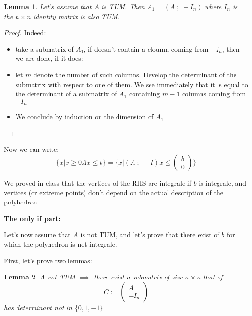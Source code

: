 \documentclass[11pt]{article}
\newtheorem{thm}{Lemma}
\begin{document}
\begin{thm}
Let's assume that \(A\) is TUM. Then  \(A_1 = (A \; ; \; -I_n )\) where \(I_n\) is the \(n \times n\) identity matrix is also TUM.
\end{thm}
\begin{proof}
Indeed:
\begin{itemize}
\item take a submatrix of \(A_1\), if doesn't contain a cloumn coming from \(-I_n\), then we are done, if it does:
\item let \(m\) denote the number of such columns. Develop the determinant of the submatrix with respect to one of them. We see immediately that it is equal to the determinant of a submatrix of \(A_1\) containing \(m-1\) columns coming from \(-I_n\)
\item We conclude by induction on the dimension of \(A_1\)
\end{itemize}
\end{proof}

Now we can write:
\[\{ x | x \ge 0 Ax \le b\} = \{ x |  (A \; ; \; -I ) x \le \begin{pmatrix}b \\ 0\end{pmatrix}  \}\]

We proved in class that the vertices of the RHS are integrale if \(b\) is integrale, and vertices (or extreme points) don't depend on the actual description of the polyhedron.

\textbf{The only if part:}

Let's now assume that \(A\) is not TUM, and let's prove that there exist of \(b\) for which the polyhedron is not integrale.

First, let's prove two lemmas:
\begin{thm}
\(A\) not TUM \(\implies\) there exist a submatrix of size \(n \times n\) that of \[ C := \begin{pmatrix}A \\ -I_n\end{pmatrix} \]  has determinant not in \(\{0, 1, -1\}\) 
\end{thm}
\end{document}
